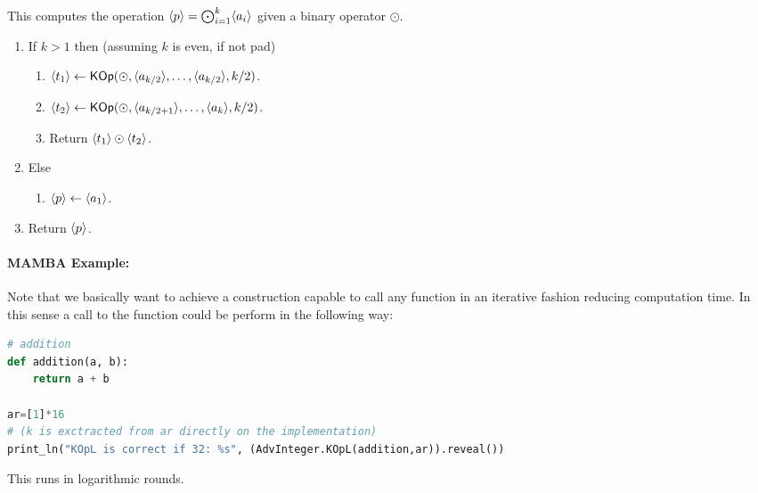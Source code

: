 This computes the operation $\langle p \rangle= \bigodot_{i=1}^k \langle a_i \rangle$
given a binary operator $\odot$.
\begin{enumerate}
  \item If $k>1$ then (assuming $k$ is even, if not pad)
        \begin{enumerate}
          \item $\langle t_1 \rangle \leftarrow \mathsf{KOp}(\odot, \langle a_{k/2} \rangle,\ldots,\langle a_{k/2} \rangle,k/2)$.
          \item $\langle t_2 \rangle \leftarrow \mathsf{KOp}(\odot, \langle a_{k/2+1} \rangle,\ldots,\langle a_k \rangle,k/2)$.
          \item Return $\langle t_1 \rangle \odot \langle t_2 \rangle$.
        \end{enumerate}
  \item Else
        \begin{enumerate}
          \item $\langle p \rangle \leftarrow \langle a_1 \rangle$.
        \end{enumerate}
  \item Return $\langle p \rangle$.
\end{enumerate}

\paragraph{MAMBA Example:} Note that we basically want to achieve a construction capable to call any function in an iterative fashion reducing computation time. In this sense a call to the function could be perform in the following way:
\begin{lstlisting}[language={python}]
# addition
def addition(a, b):
    return a + b

ar=[1]*16
# (k is exctracted from ar directly on the implementation)
print_ln("KOpL is correct if 32: %s", (AdvInteger.KOpL(addition,ar)).reveal())
\end{lstlisting}
This runs in logarithmic rounds.

